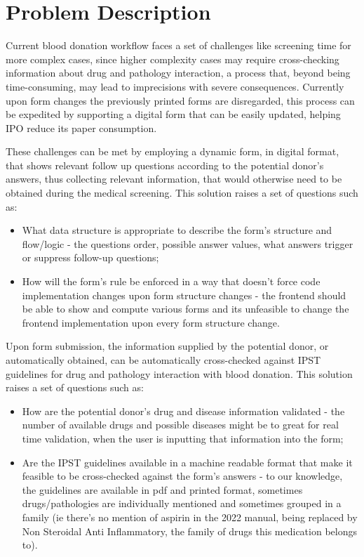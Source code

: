 %
%
\chapter{Problem Description} \label{cap:problem_description}

Current blood donation workflow faces a set of challenges like screening time for more complex cases, since higher complexity cases may require cross-checking information about drug and pathology interaction, a process that, beyond being time-consuming,  may lead to imprecisions with severe consequences. Currently upon form changes the previously printed forms are disregarded, this process can be expedited by supporting a digital form that can be easily updated, helping IPO reduce its paper consumption.

These challenges can be met by employing a dynamic form, in digital format, that shows relevant follow up questions according to the potential donor's answers, thus collecting relevant information, that would otherwise need to be obtained during the medical screening.
This solution raises a set of questions such as:
\begin{itemize}
	\item What data structure is appropriate to describe the form's structure and flow/logic - 
	the questions order, possible answer values, what answers trigger or suppress follow-up questions;
	\item How will the form's rule be enforced in a way that doesn't force code implementation changes upon form structure changes - the frontend should be able to show and compute various forms and its unfeasible to change the frontend implementation upon every form structure change.
\end{itemize}

Upon form submission, the information supplied by the potential donor, or automatically obtained, can be automatically cross-checked against IPST guidelines for drug and pathology interaction with blood donation.
This solution raises a set of questions such as:
\begin{itemize}
	\item How are the potential donor's drug and disease information validated - the number of available drugs and possible diseases might be to great for real time validation, when the user is inputting that information into the form;
	\item Are the IPST guidelines available in a machine readable format that make it feasible to be cross-checked against the form's answers - to our knowledge, the guidelines are available in pdf and printed format, sometimes drugs/pathologies are individually mentioned and sometimes grouped in a family (ie there's no mention of aspirin in the 2022 manual, being replaced by Non Steroidal Anti Inflammatory, the family of drugs this medication belongs to).
\end{itemize}

